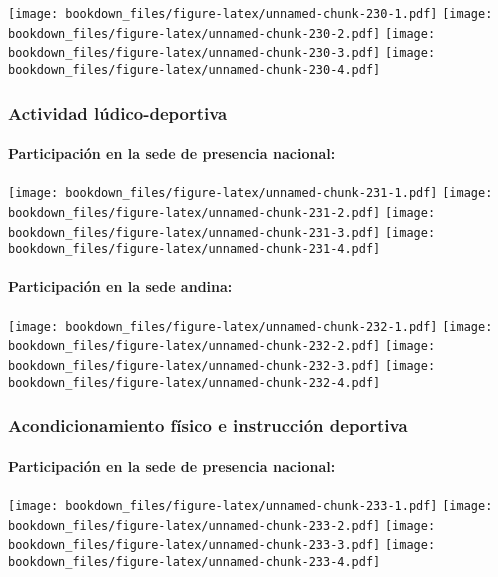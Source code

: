 \documentclass[]{article}
\let\oldparagraph\paragraph
\renewcommand{\paragraph}[1]{\oldparagraph{#1}\mbox{}}
\theoremstyle{definition}
\theoremstyle{definition}
\theoremstyle{definition}
\theoremstyle{remark}
\begin{document}
\texttt{[image: bookdown\_files/figure-latex/unnamed-chunk-230-1.pdf]}
\texttt{[image: bookdown\_files/figure-latex/unnamed-chunk-230-2.pdf]}
\texttt{[image: bookdown\_files/figure-latex/unnamed-chunk-230-3.pdf]}
\texttt{[image: bookdown\_files/figure-latex/unnamed-chunk-230-4.pdf]}

\subsubsection{Actividad
lúdico-deportiva}\label{actividad-ludico-deportiva-1}

\paragraph{Participación en la sede de presencia
nacional:}\label{participacion-en-la-sede-de-presencia-nacional-28}

\texttt{[image: bookdown\_files/figure-latex/unnamed-chunk-231-1.pdf]}
\texttt{[image: bookdown\_files/figure-latex/unnamed-chunk-231-2.pdf]}
\texttt{[image: bookdown\_files/figure-latex/unnamed-chunk-231-3.pdf]}
\texttt{[image: bookdown\_files/figure-latex/unnamed-chunk-231-4.pdf]}

\paragraph{Participación en la sede
andina:}\label{participacion-en-la-sede-andina-28}

\texttt{[image: bookdown\_files/figure-latex/unnamed-chunk-232-1.pdf]}
\texttt{[image: bookdown\_files/figure-latex/unnamed-chunk-232-2.pdf]}
\texttt{[image: bookdown\_files/figure-latex/unnamed-chunk-232-3.pdf]}
\texttt{[image: bookdown\_files/figure-latex/unnamed-chunk-232-4.pdf]}

\subsubsection{Acondicionamiento físico e instrucción
deportiva}\label{acondicionamiento-fisico-e-instruccion-deportiva-1}

\paragraph{Participación en la sede de presencia
nacional:}\label{participacion-en-la-sede-de-presencia-nacional-29}

\texttt{[image: bookdown\_files/figure-latex/unnamed-chunk-233-1.pdf]}
\texttt{[image: bookdown\_files/figure-latex/unnamed-chunk-233-2.pdf]}
\texttt{[image: bookdown\_files/figure-latex/unnamed-chunk-233-3.pdf]}
\texttt{[image: bookdown\_files/figure-latex/unnamed-chunk-233-4.pdf]}
\end{document}
